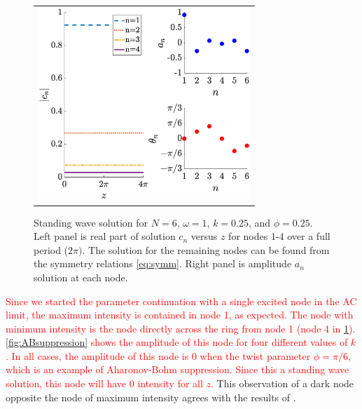 \documentclass[reprint, amsmath,amssymb,aps,pra]{revtex4-2}
\renewcommand{\revised}[1]{ \textcolor{red}{#1} }
\begin{document}
\begin{figure}
\begin{center}
\begin{tabular}{c}
\includegraphics[width=8cm]{twist025.eps}
\end{tabular}
\end{center}
\caption{Standing wave solution for $N = 6$, $\omega = 1$, $k = 0.25$, and $\phi = 0.25$. Left panel is real part of solution $c_n$ versus $z$ for nodes 1-4 over a full period ($2 \pi)$. The solution for the remaining nodes can be found from the symmetry relations \cref{eq:symm}. Right panel is amplitude $a_n$ solution at each node.}
\label{fig:twist025}
\end{figure}

\revised{Since we started the parameter continuation with a single excited node in the AC limit, the maximum intensity is contained in node 1, as expected. The node with minimum intensity is the node directly across the ring from node 1 (node 4 in \cref{fig:twist025}). \cref{fig:ABsuppression} shows the amplitude of this node for four different values of $k$. In all cases, the amplitude of this node is 0 when the twist parameter $\phi = \pi/6$, which is an example of Aharonov-Bohm suppression. Since this a standing wave solution, this node will have 0 intensity for all $z$.} This observation of a dark node opposite the node of maximum intensity agrees with the results of \cite{castro2016,Parto2017}.
\end{document}
